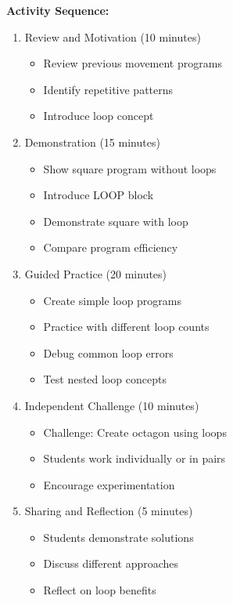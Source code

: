 \textbf{Activity Sequence:}
\begin{enumerate}
    \item Review and Motivation (10 minutes)
    \begin{itemize}
        \item Review previous movement programs
        \item Identify repetitive patterns
        \item Introduce loop concept
    \end{itemize}
    
    \item Demonstration (15 minutes)
    \begin{itemize}
        \item Show square program without loops
        \item Introduce LOOP block
        \item Demonstrate square with loop
        \item Compare program efficiency
    \end{itemize}
    
    \item Guided Practice (20 minutes)
    \begin{itemize}
        \item Create simple loop programs
        \item Practice with different loop counts
        \item Debug common loop errors
        \item Test nested loop concepts
    \end{itemize}
    
    \item Independent Challenge (10 minutes)
    \begin{itemize}
        \item Challenge: Create octagon using loops
        \item Students work individually or in pairs
        \item Encourage experimentation
    \end{itemize}
    
    \item Sharing and Reflection (5 minutes)
    \begin{itemize}
        \item Students demonstrate solutions
        \item Discuss different approaches
        \item Reflect on loop benefits
    \end{itemize}
\end{enumerate}


